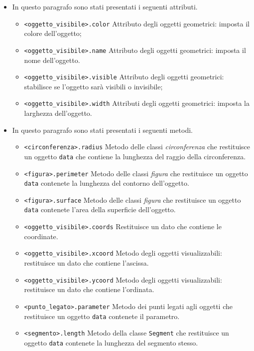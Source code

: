 \begin{itemize} [noitemsep]
\item In questo paragrafo sono stati presentati i seguenti attributi.
\begin{itemize} [noitemsep]
\item \texttt{\textless{}oggetto\_visibile\textgreater{}.color}
Attributo degli oggetti geometrici: imposta il colore dell'oggetto;
\item \texttt{\textless{}oggetto\_visibile\textgreater{}.name}
Attributo degli oggetti geometrici: imposta il nome dell'oggetto.
\item \texttt{\textless{}oggetto\_visibile\textgreater{}.visible}
Attributo degli oggetti geometrici: stabilisce se l'oggetto sarà
visibili o invisibile;
\item \texttt{\textless{}oggetto\_visibile\textgreater{}.width}
Attributi degli oggetti geometrici: imposta la larghezza dell'oggetto.
\end{itemize}

\item In questo paragrafo sono stati presentati i seguenti metodi.
\begin{itemize} [noitemsep]
\item \texttt{\textless{}circonferenza\textgreater{}.radius}
Metodo delle classi \emph{circonferenza} che  restituisce un oggetto 
\texttt{data} che contiene la lunghezza del raggio della circonferenza.
\item \texttt{\textless{}figura\textgreater{}.perimeter}
Metodo delle classi \emph{figura} che  restituisce un oggetto \texttt{data}
contenete la lunghezza del contorno dell'oggetto.
\item \texttt{\textless{}figura\textgreater{}.surface}
Metodo delle classi \emph{figura} che  restituisce un oggetto \texttt{data}
contenete l'area della superficie dell'oggetto.
\item \texttt{\textless{}oggetto\_visibile\textgreater{}.coords}
Restituisce un dato che contiene le coordinate.
\item \texttt{\textless{}oggetto\_visibile\textgreater{}.xcoord}
Metodo degli oggetti visualizzabili: restituisce un dato che contiene
l'ascissa.
\item \texttt{\textless{}oggetto\_visibile\textgreater{}.ycoord}
Metodo degli oggetti visualizzabili: restituisce un dato che contiene
l'ordinata.
\item \texttt{\textless{}punto\_legato\textgreater{}.parameter}
Metodo dei punti legati agli oggetti che restituisce un oggetto \texttt{data}
contenete il parametro.
\item \texttt{\textless{}segmento\textgreater{}.length}
Metodo della classe \texttt{Segment} che restituisce un oggetto \texttt{data}
contenete la lunghezza del segmento stesso.
\end{itemize}
\end{itemize}

